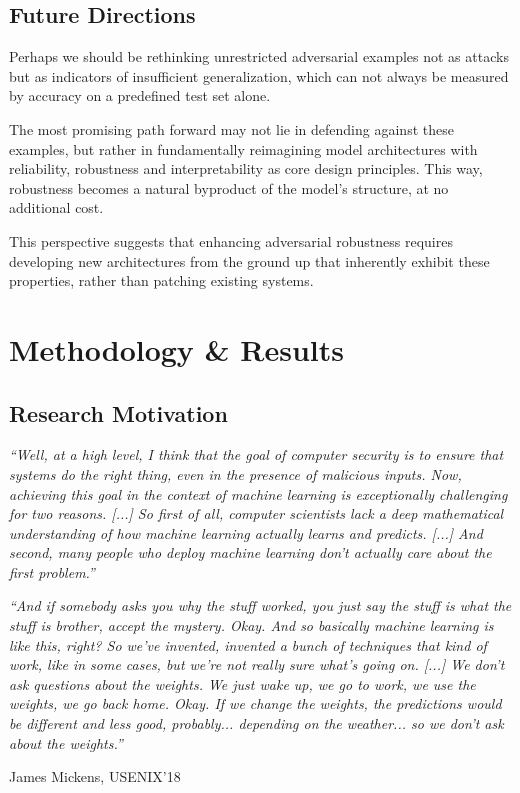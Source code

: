 \documentclass[a4paper, oneside]{discothesis}
\begin{document}
\section{Future Directions}

Perhaps we should be rethinking unrestricted adversarial examples not as attacks but as indicators of insufficient generalization, which can not always be measured by accuracy on a predefined test set alone.

The most promising path forward may not lie in defending against these examples, but rather in fundamentally reimagining model architectures with reliability, robustness and interpretability as core design principles. This way, robustness becomes a natural byproduct of the model's structure, at no additional cost.

This perspective suggests that enhancing adversarial robustness requires developing new architectures from the ground up that inherently exhibit these properties, rather than patching existing systems.

% 
% 

\chapter{Methodology \& Results}

\section{Research Motivation}

\begin{quotebox}
	\begin{flushright}
		\textit{``Well, at a high level, I think that the goal of computer security is to ensure that systems do the right thing, even in the presence of malicious inputs. Now, achieving this goal in the context of machine learning is exceptionally challenging for two reasons. [...] So first of all, computer scientists lack a deep mathematical understanding of how machine learning actually learns and predicts. [...] And second, many people who deploy machine learning don't actually care about the first problem.''}
		\vspace{1em}

		\textit{``And if somebody asks you why the stuff worked, you just say the stuff is what the stuff is brother, accept the mystery. Okay. And so basically machine learning is like this, right? So we've invented, invented a bunch of techniques that kind of work, like in some cases, but we're not really sure what's going on. [...] We don't ask questions about the weights. We just wake up, we go to work, we use the weights, we go back home. Okay. If we change the weights, the predictions would be different and less good, probably... depending on the weather... so we don't ask about the weights.''}
		\vspace{1em}

		\textemdash{} James Mickens, USENIX'18~\cite{218395}
	\end{flushright}
\end{quotebox}
\end{document}
